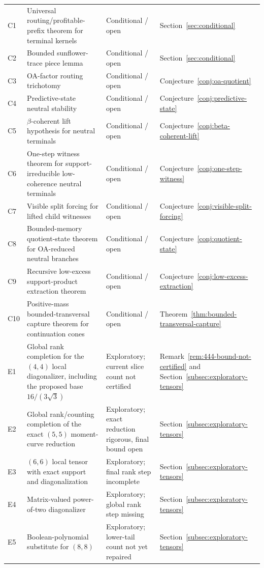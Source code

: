 \documentclass[11pt]{article}
\theoremstyle{definition}
\newcommand{\1}{\mathbf{1}}
\begin{document}
\begin{longtable}{p{}p{}p{}p{}}
C1 & Universal routing/profitable-prefix theorem for terminal kernels & Conditional / open & Section~\ref{sec:conditional}\\
C2 & Bounded sunflower-trace piece lemma & Conditional / open & Section~\ref{sec:conditional}\\
C3 & OA-factor routing trichotomy & Conditional / open & Conjecture~\ref{conj:oa-quotient}\\
C4 & Predictive-state neutral stability & Conditional / open & Conjecture~\ref{conj:predictive-state}\\
C5 & $\beta$-coherent lift hypothesis for neutral terminals & Conditional / open & Conjecture~\ref{conj:beta-coherent-lift}\\
C6 & One-step witness theorem for support-irreducible low-coherence neutral terminals & Conditional / open & Conjecture~\ref{conj:one-step-witness}\\
C7 & Visible split forcing for lifted child witnesses & Conditional / open & Conjecture~\ref{conj:visible-split-forcing}\\
C8 & Bounded-memory quotient-state theorem for OA-reduced neutral branches & Conditional / open & Conjecture~\ref{conj:quotient-state}\\
C9 & Recursive low-excess support-product extraction theorem & Conditional / open & Conjecture~\ref{conj:low-excess-extraction}\\
C10 & Positive-mass bounded-transversal capture theorem for continuation cones & Conditional / open & Theorem~\ref{thm:bounded-transversal-capture}\\
E1 & Global rank completion for the $(4,4)$ local diagonalizer, including the proposed base $16/(3\sqrt 3)$ & Exploratory; current slice count not certified & Remark~\ref{rem:444-bound-not-certified} and Section~\ref{subsec:exploratory-tensors}\\
E2 & Global rank/counting completion of the exact $(5,5)$ moment-curve reduction & Exploratory; exact reduction rigorous, final bound open & Section~\ref{subsec:exploratory-tensors}\\
E3 & $(6,6)$ local tensor with exact support and diagonalization & Exploratory; final rank step incomplete & Section~\ref{subsec:exploratory-tensors}\\
E4 & Matrix-valued power-of-two diagonalizer & Exploratory; global rank step missing & Section~\ref{subsec:exploratory-tensors}\\
E5 & Boolean-polynomial substitute for $(8,8)$ & Exploratory; lower-tail count not yet repaired & Section~\ref{subsec:exploratory-tensors}\\
\bottomrule
\end{longtable}
\end{document}
